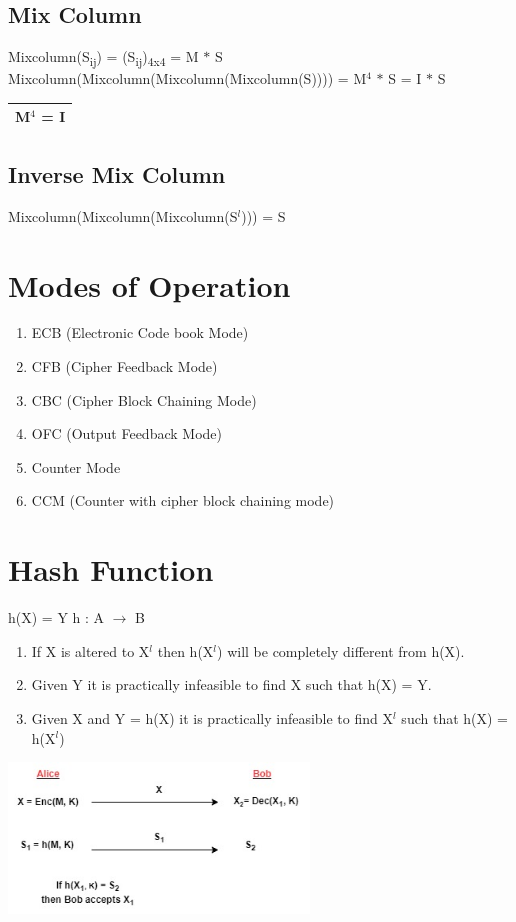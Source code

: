 \documentclass[11pt]{article}
\begin{document}
	\subsection{Mix Column}
	Mixcolumn(S\textsubscript{ij}) = (S\textsubscript{ij})\textsubscript{4x4} = M $\ast$ S\\
	Mixcolumn(Mixcolumn(Mixcolumn(Mixcolumn(S)))) = M$^4$ $\ast$ S = I $\ast$ S\hfill 
	\begin{tabular}{| c |}
		\hline
		M$^4$ = I\\
		\hline
	\end{tabular}
	\subsection{Inverse Mix Column}
	Mixcolumn(Mixcolumn(Mixcolumn(S$^l$))) = S
	\section{Modes of Operation}
	\begin{enumerate}
		\item ECB (Electronic Code book Mode)
		\item CFB (Cipher Feedback Mode)
		\item CBC (Cipher Block Chaining Mode)
		\item OFC (Output Feedback Mode)
		\item Counter Mode
		\item CCM (Counter with cipher block chaining mode)
	\end{enumerate}
	\section{Hash Function}
	h(X) = Y \hspace{2cm} h : A $\rightarrow$ B
	\begin{enumerate}
		\item If X is altered to X$^l$ then h(X$^l$) will be completely different from h(X).
		\item Given Y it is practically infeasible to find X such that h(X) = Y.
		\item Given X and Y = h(X) it is practically infeasible to find X$^l$ such that h(X) = h(X$^l$)
	\end{enumerate}
	\begin{center}
		\includegraphics[width=8cm]{Hash1.jpg}
	\end{center}
\end{document}
